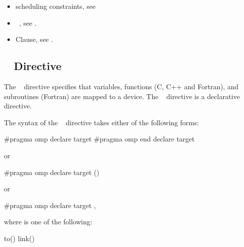 {{{{\begin{itemize}
\item {} scheduling constraints, see 

\item {}~, see 
. 

\item {} Clause, see .


\end{itemize}










\subsection{~ Directive}
\label{subsec:declare target Directive}
\summary
The ~ directive specifies that variables, 
functions (C, C++ and Fortran), and subroutines (Fortran) are mapped 
to a device. The ~ directive is a declarative 
directive.

\syntax
\ccppspecificstart
The syntax of the ~ directive takes either of 
the following forms:

\begin{boxedcode}
\#pragma omp declare target 
\#pragma omp end declare target 
\end{boxedcode}

or

\begin{boxedcode}
\#pragma omp declare target () 
\end{boxedcode}

or

\begin{boxedcode}
\#pragma omp declare target \plc{clause[ [},\plc{] clause ... ] new-line}
\end{boxedcode}

where  is one of the following:

\begin{indentedcodelist}
to()
link()
\end{indentedcodelist}
\ccppspecificend

}}}}
